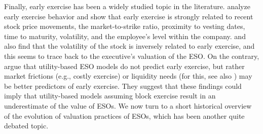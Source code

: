     Finally, early exercise has been a widely studied topic in the literature. \cite{huddart1996employee} analyze early exercise behavior and show that early exercise is strongly related to recent stock price movements, the market-to-strike ratio, proximity to vesting dates, time to maturity, volatility, and the employee's level within the company. \cite{heron2017stock} and \cite{izhakian2017risk} also find that the volatility of the stock is inversely related to early exercise, and this seems to trace back to the executive's valuation of the ESO. On the contrary, \cite{grasselli2009risk} argue that utility-based ESO models do not predict early exercise, but rather market frictions (e.g., costly exercise) or liquidity needs (for this, see also \cite{murphy2019employees}) may be better predictors of early exercise. They suggest that these findings could imply that utility-based models assuming block exercise result in an underestimate of the value of ESOs. 
    We now turn to a short historical overview of the evolution of valuation practices of ESOs, which has been another quite debated topic. 

